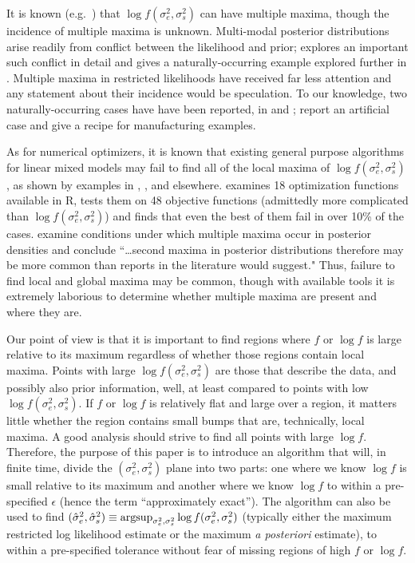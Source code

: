 \documentclass{report}
\newcommand{\textcompute}{\textsf}
\newcommand{\R}{\textcompute{R}\xspace}
\newcommand{\RL}{f}
\newcommand{\logRL}{\log\RL}
\newcommand{\sigssq}{\sigma_s^2}
\newcommand{\sigesq}{\sigma_e^2}
\newcommand{\sshat}{\hat\sigma^2_e,\hat\sigma^2_s}
\newcommand{\logRLss}{\logRL(\sigesq,\sigssq)}
\newcommand{\argsup}{\operatornamewithlimits{argsup}}
\begin{document}
It is known (e.g.\ \citealt{henn&hodges:2014}) that $\logRLss$
can have multiple maxima,
though the incidence of multiple maxima is unknown.  Multi-modal posterior distributions arise readily from conflict between the likelihood and prior;  \cite{Liu&Hodges:2003} explores an important such conflict in detail and \cite{wakefield:1998} gives a naturally-occurring example explored further in \cite{henn&hodges:2014}.  Multiple maxima in restricted likelihoods have received far less attention and any statement about their incidence would be speculation.  To our knowledge, two naturally-occurring cases have have been reported, in \cite{welham_thompson:2009} and \cite{reiss_etal:2014};  \cite{henn&hodges:2014} report an artificial case and give a recipe for manufacturing examples.  

As for numerical optimizers, it is known that existing general purpose algorithms for linear mixed models may fail to find all of the local maxima of $\logRLss$, as shown by examples in \cite{hodges:2013}, \cite{henn&hodges:2014}, and elsewhere.  \cite{mullen:2014} examines 18 optimization functions available in \R, tests them on 48 objective functions (admittedly more complicated than $\logRLss$) and finds that even the best of them fail in over 10\% of the cases.  \cite{henn&hodges:2014} examine conditions under which multiple maxima occur in posterior densities and conclude ``\dots second maxima in posterior distributions therefore may be more common than reports in the literature would suggest."  Thus, failure to find local and global maxima may be common, though with available tools it is extremely laborious to determine whether multiple maxima are present and where they are.

Our point of view is that it is important to find regions where $f$ or $\log f$ is large relative to its maximum regardless of whether those regions contain local maxima.  Points with large $\logRLss$ are those that describe the data, and possibly also prior information, well, at least compared to points with low $\logRLss$.  If $f$ or $\log f$ is relatively flat and large over a region, it matters little whether the region contains small bumps that are, technically, local maxima.  A good analysis should strive to find all  points with large $\logRL$.  Therefore, the purpose of this paper is to introduce an algorithm that will, in finite time, divide the $(\sigesq,\sigssq)$ plane into two parts: one where we know $\logRL$ is small relative to its maximum and another where we know $\logRL$ to within a pre-specified $\epsilon$ (hence the term ``approximately exact'').  The algorithm can also be used to find $(\sshat) \equiv \argsup_{\sigesq, \sigssq}\logRLss$  (typically either the maximum restricted log likelihood estimate or the maximum \textit{a posteriori} estimate), to within a pre-specified tolerance without fear of missing regions of high $f$ or $\logRL$.
\end{document}
